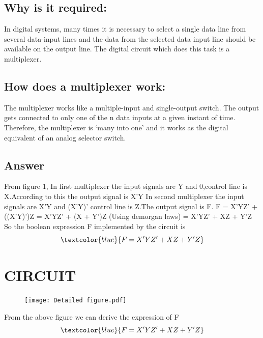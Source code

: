 \documentclass{report}
\begin{document}
\subsection{Why is it required:}

In digital systems, many times it is necessary to select a single data line from several data-input lines and the data from the selected data input line should be available on the output line. The digital circuit which does this task is a multiplexer.

\subsection{How does a multiplexer work:}

The multiplexer works like a multiple-input and single-output switch. The output gets connected to only one of the n data inputs at a given instant of time. Therefore, the multiplexer is ‘many into one’ and it works as the digital equivalent of an analog selector switch.

\subsection{Answer}
From figure 1,
\newline 
In first multiplexer the input signals are Y and 0,control line is X.According to this the output signal is X'Y
\newline
In second multiplexer the input signals are X'Y and (X'Y)' control line is Z.The output signal is F.
\newline
\newline
F = X'YZ' + ((X'Y)')Z
\newline
\newline
  = X'YZ' + (X + Y')Z   \hspace{3}       (Using demorgan laws)
\newline\newline
= X'YZ' + XZ + Y'Z 
\newline
So the boolean expression F implemented by the circuit is
\newline
\begin{equation}
   \textcolor{blue}{F = X'YZ'+XZ+Y'Z}
\end{equation}
 

\newpage
\section{CIRCUIT}
\begin{figure}[htp]
        \centering
        \texttt{[image: Detailed figure.pdf]}
         \caption{}
        \label{fig:ok}
\end{figure}
\newline
From the above figure we can derive the expression of F
\newline
\begin{equation}
   \textcolor{blue}{F = X'YZ'+XZ+Y'Z}
\end{equation}
\end{document}
